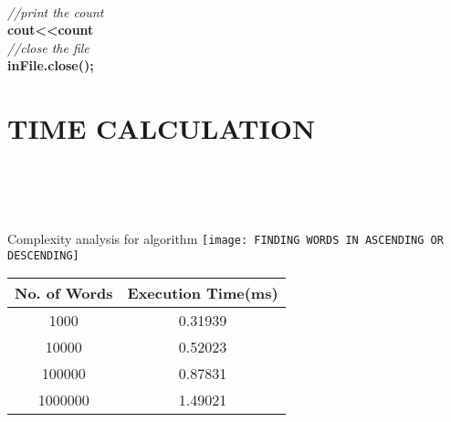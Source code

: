 \documentclass[conference]{IEEEtran}
\begin{document}
\begin{algorithm}[H]
{{    } 
       \\\textit{//print the count }
      \\\textbf{cout<<count }
      \\ \textit{//close the file} 
      \\\textbf{inFile.close();} 

 }
\end{algorithm}



   
\section{TIME CALCULATION }\\

\graphicspath{ {./images/} }
\\\\Complexity analysis for algorithm 
\texttt{[image: FINDING WORDS IN ASCENDING OR DESCENDING]}

\begin{center}
 \begin{tabular}{||c c||} 
 \hline
 No. of Words & Execution Time(ms) \\ [1.0ex] 
 \hline\hline
 1000 & 0.31939 \\ 
 \hline
 10000 & 0.52023 \\
 \hline
 100000 & 0.87831\\
 \hline
 1000000 & 1.49021 \\
 \hline
\end{tabular}
\end{center}
\\\\
\end{document}
